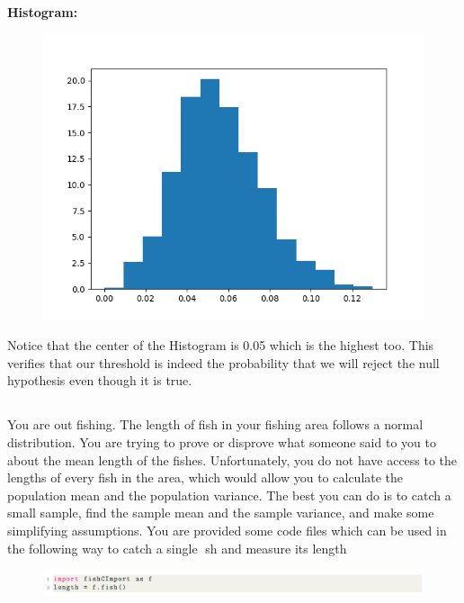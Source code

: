 \documentclass[answers]{exam}
\begin{document}
\begin{framed}
\textbf{Histogram:}\\
\begin{figure}[H] %
    \centering
    \includegraphics[width=0.5 \textwidth]{Q5.1_histogram.png}
\end{figure}

Notice that the center of the Histogram is 0.05 which is the highest too. This verifies that our threshold is indeed the probability that we will reject the null hypothesis even though it is true. \\  
\end{framed}

\subsection{} You are out fishing. The length of fish in your fishing area follows a normal distribution. You are trying to prove or disprove what someone said to you to about the mean length of the fishes. Unfortunately, you do not have access to the lengths of every fish in the area, which would allow you to calculate the population mean and the population variance. The best you can do is to catch a small sample, find the sample mean and the sample variance, and make some simplifying assumptions. You are provided some code files which can be used in the following way to catch a single sh and measure its length

\begin{figure}[H] %
    \centering
    \includegraphics[width= 1 \textwidth]{Q5.2.PNG}
\end{figure}

\end{document}
